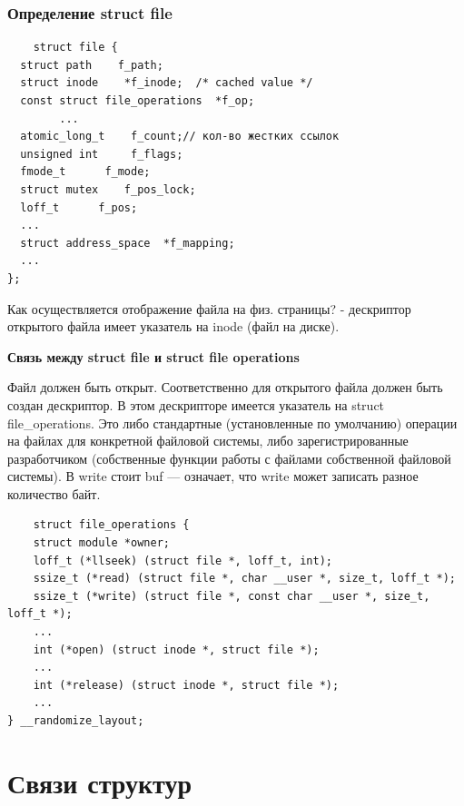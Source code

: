 \subsubsection{Определение struct file}
\begin{lstlisting}
    struct file {
  struct path    f_path;
  struct inode    *f_inode;  /* cached value */
  const struct file_operations  *f_op;
        ...
  atomic_long_t    f_count;// кол-во жестких ссылок
  unsigned int     f_flags;
  fmode_t      f_mode;
  struct mutex    f_pos_lock;
  loff_t      f_pos;
  ...
  struct address_space  *f_mapping;
  ...
};
\end{lstlisting}
Как осуществляется отображение файла на физ. страницы? - дескриптор открытого файла имеет указатель на inode (файл на диске).

\textbf{Связь между struct file и struct file operations}

Файл должен быть открыт. Соответственно для открытого файла должен быть создан дескриптор. В этом дескрипторе имеется указатель на struct file\_operations. Это либо стандартные (установленные по умолчанию) операции на файлах для конкретной файловой системы, либо зарегистрированные разработчиком (собственные функции работы с файлами собственной файловой системы). В write стоит buf --- означает, что write может записать разное количество байт.

\begin{lstlisting}
	struct file_operations {
	struct module *owner;
	loff_t (*llseek) (struct file *, loff_t, int);
	ssize_t (*read) (struct file *, char __user *, size_t, loff_t *);
	ssize_t (*write) (struct file *, const char __user *, size_t, loff_t *);
	...
	int (*open) (struct inode *, struct file *);
	...
	int (*release) (struct inode *, struct file *);
	...
} __randomize_layout;
\end{lstlisting}

\section{Связи структур}

